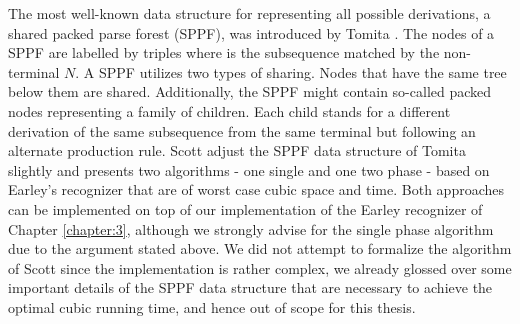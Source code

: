 \begin{isabellebody}
\begin{isamarkuptext}
The most well-known data structure for representing all possible derivations, a shared packed parse
forest (SPPF), was introduced by Tomita \cite{Tomita:1985}. The nodes of a SPPF are labelled by
triples  where  is the subsequence matched by the non-terminal $N$.
A SPPF utilizes two types of sharing. Nodes that have the same tree below them are shared. Additionally,
the SPPF might contain so-called packed nodes representing a family of children. Each child stands for
a different derivation of the same subsequence  from the same terminal but following an
alternate production rule. Scott \cite{Scott:2008} adjust the SPPF data structure of Tomita slightly
and presents two algorithms - one single and one two phase - based on Earley's recognizer that are of
worst case cubic space and time. Both approaches can be implemented on top of our implementation of
the Earley recognizer of Chapter \ref{chapter:3}, although we strongly advise for the single phase algorithm
due to the argument stated above. We did not attempt to formalize the algorithm of Scott since the
implementation is rather complex, we already glossed over some important details of the SPPF data structure
that are necessary to achieve the optimal cubic running time, and hence out of scope for this thesis.%
\end{isamarkuptext}\isamarkuptrue%
%
\isadelimtheory
%
\endisadelimtheory
%
\isatagtheory
%
\endisatagtheory
{\isafoldtheory}%
%
\isadelimtheory
%
\endisadelimtheory
%
\end{isabellebody}%
\endinput
